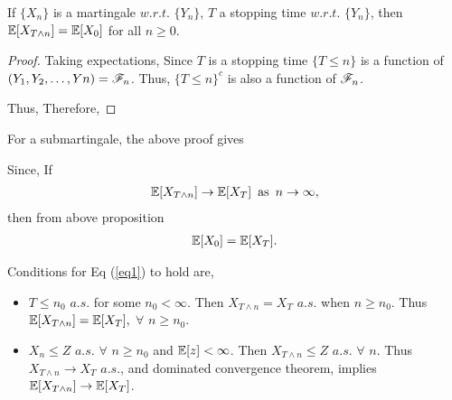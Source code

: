 \documentclass[all-lectures.tex]{subfiles}
\begin{document}
\begin{prop}
If $\{X_n\}$ is a martingale $w.r.t.$ $\{Y_n\}$, $T$ a stopping time $w.r.t.$ $\{Y_n\}$, then $\mathbb{E}[X_{T \wedge n}] = \mathbb{E}[X_0]$ for all $n\ge0$.
\end{prop}
\begin{proof}
Taking expectations,
Since $T$ is a stopping time $\{T \le n\}$ is a function of $(Y_1, Y_2, \dots, Yn) = \mathscr{F}_n$. Thus, $\{T \le n\}^c$ is also a function of $\mathscr{F}_n$.

Thus,
Therefore,
\end{proof}
For a submartingale, the above proof gives 

Since,
If 
\begin{align}
\label{eq1}	
\mathbb{E}[X_{T \wedge n}] \to \mathbb{E}[X_T] \enskip \text{as} \enskip n \to \infty,
\end{align}
then  from above proposition 
\begin{align}
\label{eq2}
\mathbb{E}[X_0] = \mathbb{E}[X_T].
\end{align}


Conditions for Eq (\ref{eq1}) to hold are,
\begin{itemize}
\item $T \le n_0$  $a.s.$ for some $n_0<\infty$.
 Then $X_{T \wedge n} = X_T$ $a.s.$ when $n\ge n_0$. Thus $\mathbb{E}[X_{T \wedge n}] = \mathbb{E}[X_T],$ $\forall$ $n \ge n_0$.
\item $X_n \le Z$ $a.s.$ $\forall$ $n \ge n_0$ and $\mathbb{E}[z] < \infty$. Then $X_{T \wedge n} \le Z$ $a.s.$ $\forall$ $n$. Thus $X_{T \wedge n} \to X_T$ $a.s.$, and dominated convergence theorem, implies $\mathbb{E}[X_{T \wedge n}] \to \mathbb{E}[X_T]$.
\end{itemize}
\end{document}
